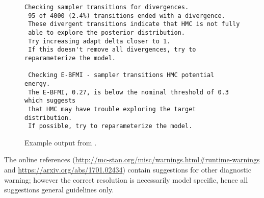 \begin{figure}
\begin{Verbatim}[fontsize=\footnotesize]
 Checking sampler transitions for divergences.
 95 of 4000 (2.4%) transitions ended with a divergence.
 These divergent transitions indicate that HMC is not fully
 able to explore the posterior distribution.
 Try increasing adapt delta closer to 1.
 If this doesn't remove all divergences, try to reparameterize the model.

 Checking E-BFMI - sampler transitions HMC potential energy.
 The E-BFMI, 0.27, is below the nominal threshold of 0.3 which suggests
 that HMC may have trouble exploring the target distribution.
 If possible, try to reparameterize the model.
\end{Verbatim}
\caption{Example output from .}
\label{bin-diagnose-eg.figure}
\end{figure}

The online references (\url{http://mc-stan.org/misc/warnings.html#runtime-warnings}
and \url{https://arxiv.org/abs/1701.02434}) contain suggestions for
other diagnostic warning; however the correct resolution is
necessarily model specific, hence all suggestions general guidelines only.
